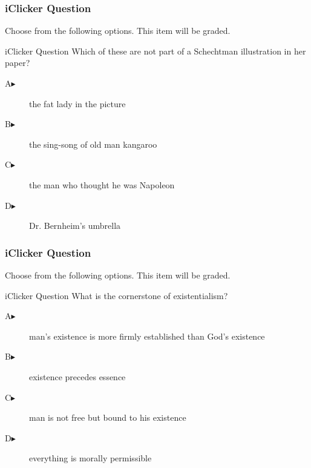 \documentclass[xcolor=dvipsnames]{beamer}
\begin{document}
\begin{frame}
  \frametitle{iClicker Question}
Choose from the following options. This item will be graded.
\begin{block}{iClicker Question}
Which of these are not part of a Schechtman illustration in her paper?
\end{block}
\begin{description}
\item[A\hspace{.2in}$\blacktriangleright$] the fat lady in the picture
\item[B\hspace{.2in}$\blacktriangleright$] the sing-song of old man kangaroo
\item[C\hspace{.2in}$\blacktriangleright$] the man who thought he was Napoleon
\item[D\hspace{.2in}$\blacktriangleright$] Dr. Bernheim's umbrella
\end{description}
\end{frame}

\begin{frame}
  \frametitle{iClicker Question}
Choose from the following options. This item will be graded.
\begin{block}{iClicker Question}
What is the cornerstone of existentialism?
\end{block}
\begin{description}
\item[A\hspace{.2in}$\blacktriangleright$] man's existence is more firmly established than God's existence
\item[B\hspace{.2in}$\blacktriangleright$] existence precedes essence
\item[C\hspace{.2in}$\blacktriangleright$] man is not free but bound to his existence
\item[D\hspace{.2in}$\blacktriangleright$] everything is morally permissible
\end{description}
\end{frame}
\end{document}
